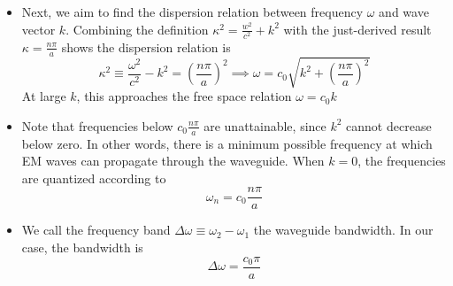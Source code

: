 \documentclass[11pt, a4paper]{article}
\begin{document}
\begin{itemize}
	\item Next, we aim to find the dispersion relation between frequency $ \omega $ and wave vector $ k $. Combining the definition $ \kappa^{2} = \frac{w^{2}}{c^{2}} + k^{2} $ with the just-derived result $ \kappa = \frac{n\pi}{a} $ shows the dispersion relation is
	\begin{equation*}
		\kappa^{2} \equiv \frac{\omega^{2}}{c^{2}} - k^{2} = \left(\frac{n\pi}{a}\right)^{2} \implies \omega = c_{0}\sqrt{k^{2} + \left(\frac{n\pi}{a}\right)^{2}}
	\end{equation*}
	At large $ k $, this approaches the free space relation $ \omega = c_{0}k $
	
	\item Note that frequencies below $ c_{0}\frac{n\pi}{a} $ are unattainable, since $ k^{2} $ cannot decrease below zero. In other words, there is a minimum possible frequency at which EM waves can propagate through the waveguide. When $ k = 0 $, the frequencies are quantized according to
	\begin{equation*}
		\omega_{n} = c_{0}\frac{n\pi}{a}
	\end{equation*}
	
	\item We call the frequency band $ \Delta \omega \equiv \omega_{2} - \omega_{1} $ the waveguide bandwidth. In our case, the bandwidth is
	\begin{equation*}
		\Delta \omega = \frac{c_{0}\pi}{a}
	\end{equation*}
\end{itemize}
\end{document}
